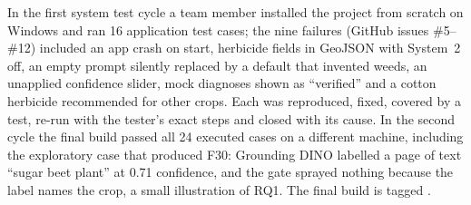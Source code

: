 In the first system test cycle a team member installed the project from scratch on Windows and ran
16 application test cases; the nine failures (GitHub issues \#5--\#12) included an app crash on start,
herbicide fields in GeoJSON with System~2 off, an empty prompt silently replaced by a default that
invented weeds, an unapplied confidence slider, mock diagnoses shown as ``verified'' and a cotton
herbicide recommended for other crops. Each was reproduced, fixed, covered by a test, re-run with the
tester's exact steps and closed with its cause. In the second cycle the final build passed all 24
executed cases on a different machine, including the exploratory case that produced F30: Grounding DINO
labelled a page of text ``sugar beet plant'' at 0.71 confidence, and the gate sprayed nothing because
the label names the crop, a small illustration of RQ1. The final build is tagged .
